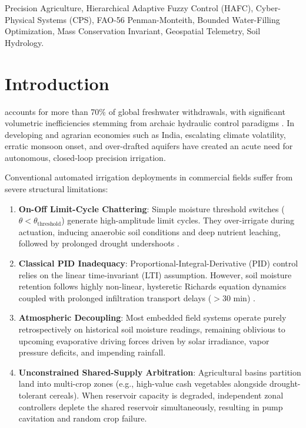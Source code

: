 \documentclass[conference]{IEEEtran}
\begin{document}
\begin{IEEEkeywords}
Precision Agriculture, Hierarchical Adaptive Fuzzy Control (HAFC), Cyber-Physical Systems (CPS), FAO-56 Penman-Monteith, Bounded Water-Filling Optimization, Mass Conservation Invariant, Geospatial Telemetry, Soil Hydrology.
\end{IEEEkeywords}

\section{Introduction}
 accounts for more than 70\% of global freshwater withdrawals, with significant volumetric inefficiencies stemming from archaic hydraulic control paradigms \cite{allen1998crop}. In developing and agrarian economies such as India, escalating climate volatility, erratic monsoon onset, and over-drafted aquifers have created an acute need for autonomous, closed-loop precision irrigation.

Conventional automated irrigation deployments in commercial fields suffer from severe structural limitations:
\begin{enumerate}
    \item \textbf{On-Off Limit-Cycle Chattering}: Simple moisture threshold switches ($\theta < \theta_{\text{threshold}}$) generate high-amplitude limit cycles. They over-irrigate during actuation, inducing anaerobic soil conditions and deep nutrient leaching, followed by prolonged drought undershoots \cite{zhang2021intelligent}.
    \item \textbf{Classical PID Inadequacy}: Proportional-Integral-Derivative (PID) control relies on the linear time-invariant (LTI) assumption. However, soil moisture retention follows highly non-linear, hysteretic Richards equation dynamics coupled with prolonged infiltration transport delays ($>30\text{ min}$) \cite{bwire2023closed}.
    \item \textbf{Atmospheric Decoupling}: Most embedded field systems operate purely retrospectively on historical soil moisture readings, remaining oblivious to upcoming evaporative driving forces driven by solar irradiance, vapor pressure deficits, and impending rainfall.
    \item \textbf{Unconstrained Shared-Supply Arbitration}: Agricultural basins partition land into multi-crop zones (e.g., high-value cash vegetables alongside drought-tolerant cereals). When reservoir capacity is degraded, independent zonal controllers deplete the shared reservoir simultaneously, resulting in pump cavitation and random crop failure.
\end{enumerate}
\end{document}
